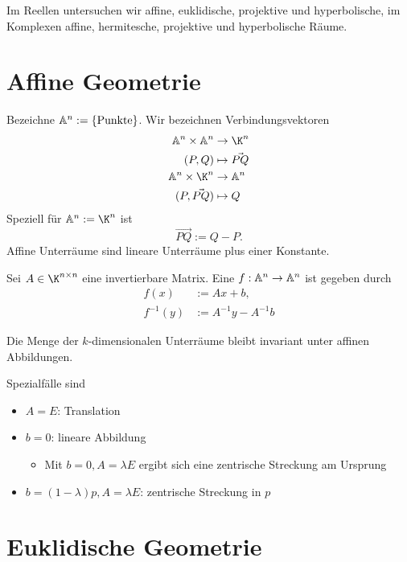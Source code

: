 Im Reellen untersuchen wir affine, euklidische, projektive und hyperbolische, im Komplexen affine, hermitesche, projektive und hyperbolische Räume.


\section{Affine Geometrie}

Bezeichne $\mathbb{A}^n := \{ \text{Punkte} \}$.
Wir bezeichnen Verbindungsvektoren
\begin{align*}
	\A^n \times \A^n &\to \K^n \\
	(P, Q) &\mapsto \vec{PQ} \\
	\A^n \times \K^n &\to \A^n \\
	(P, \vec{PQ}) &\mapsto Q
\end{align*}
Speziell für $\A^n := \K^n$ ist
\[
	\vec{PQ} := Q - P.
\]
Affine Unterräume sind lineare Unterräume plus einer Konstante.

\begin{df}
	Sei $A \in \K^{n\times n}$ eine invertierbare Matrix.
	Eine  $f: \mathbb{A}^n \to \mathbb{A}^n$ ist gegeben durch
	\begin{align*}
		f(x) &:= Ax + b, \\
		f^{-1}(y) &:= A^{-1} y  - A^{-1} b
	\end{align*}
	\begin{note}
		Die Menge der $k$-dimensionalen Unterräume bleibt invariant unter affinen Abbildungen.
	\end{note}
	\begin{note}
		Spezialfälle sind
		\begin{itemize}
			\item
				$A = E$: Translation
			\item
				$b = 0$: lineare Abbildung
				\begin{itemize}
					\item
						Mit $b = 0, A = \lambda E$ ergibt sich eine zentrische Streckung am Ursprung
				\end{itemize}
			\item
				$b = (1 - \lambda) p, A = \lambda E$: zentrische Streckung in $p$
		\end{itemize}
	\end{note}
\end{df}

\section{Euklidische Geometrie}


